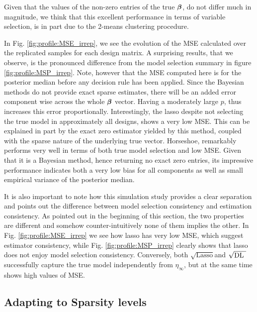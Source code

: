 \documentclass[10pt]{article}
\def\sql{$\sqrt{\text{Lasso}}$}
\def\sqdl{$\sqrt{\text{\rm{DL} }}$}
\begin{document}
Given that the values of the non-zero entries of the true $\boldsymbol{\beta}$, do not differ much in magnitude, we think that this excellent performance in terms of variable selection, is in part due to the 2-means clustering procedure. 

In Fig. \ref{fig:profile:MSE_irrep}, we see the evolution of the MSE calculated over the replicated samples for each design matrix. A surprising results, that we observe, is the pronounced difference from the model selection summary in figure \ref{fig:profile:MSP_irrep}. Note, however that the MSE computed here is for the posterior median before any decision rule has been applied. Since the Bayesian methods do not provide exact sparse estimates, there will be an added error component wise across the whole $\boldsymbol{\beta}$ vector. Having a moderately large $p$, thus increases this error proportionally. Interestingly, the lasso despite not selecting the true model in approximately all designs, shows a very low MSE. This can be explained in part by the exact zero estimator yielded by this method, coupled with the sparse nature of the underlying true vector. Horseshoe, remarkably performs very well in terms of both true model selection and low MSE. Given that it is a Bayesian method, hence returning no exact zero entries, its impressive performance indicates both a very low bias for all components as well as small empirical variance of the posterior median.


It is also important to note how this simulation study provides a clear separation and points out the difference between model selection consistency and estimation consistency. As pointed out in the beginning of this section, the two properties are different and somehow counter-intuitively none of them implies the other. In Fig. \ref{fig:profile:MSE_irrep} we see how lasso has very low MSE, which suggest estimator consistency, while Fig. \ref{fig:profile:MSP_irrep} clearly shows that lasso does not enjoy model selection consistency. Conversely, both \sql and \sqdl successfully capture the true model independently from $\eta_{\infty}$, but at the same time shows high values of MSE.



\subsection{Adapting to Sparsity levels}
\end{document}
